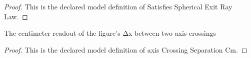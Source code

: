 \begin{proof}
  This is the declared model definition of Satisfies Spherical Exit Ray Law.
\end{proof}
\begin{definition}
  \label{def:physics:phyx-mini-0028:phyxminiproblems-problemphyxmini0028-axiscrossingseparationcm}
  The centimeter readout of the figure's Δx between two axis crossings
\end{definition}
\begin{proof}
  This is the declared model definition of axis Crossing Separation Cm.
\end{proof}
